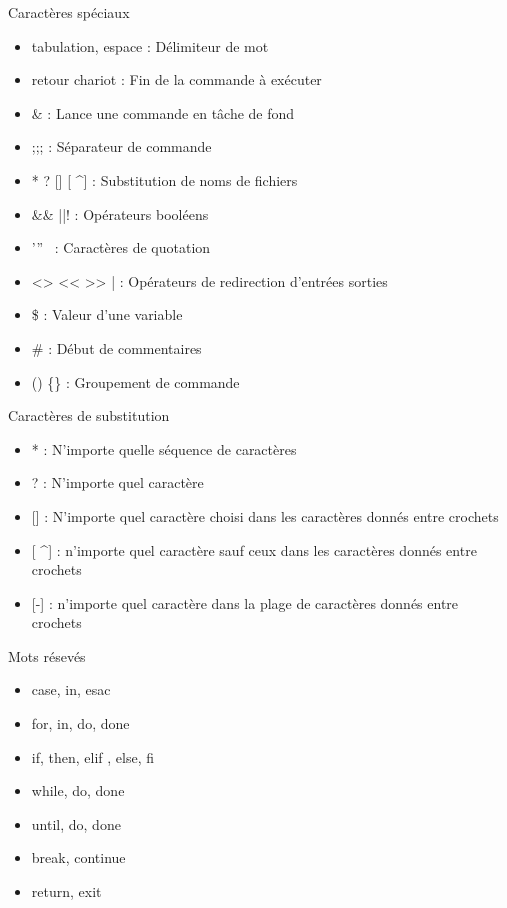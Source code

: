 \documentclass[10pt]{beamer}
\begin{document}
\begin{frame}[fragile]{Caractères spéciaux}

\begin{itemize}
\item \alert{tabulation, espace} : Délimiteur de mot
\item \alert{retour chariot }: Fin de la commande à exécuter
\item \alert{ \& }: Lance une commande en tâche de fond
\item \alert{ ;;; }: Séparateur de commande
\item \alert{* ? [] [ \textasciicircum ] }: Substitution de noms de fichiers
\item \alert{\&\& ||! }: Opérateurs booléens
\item \alert{'” \ }: Caractères de quotation
\item \alert{<> << >> | }: Opérateurs de redirection d'entrées sorties 
\item \alert{\$ } : Valeur d'une variable 
\item \alert{\# } : Début de commentaires
\item \alert{() \{\} } : Groupement de commande
\end{itemize}
\end{frame}


\begin{frame}{Caractères de substitution}
\begin{itemize}
\item \alert{*} : N'importe quelle séquence de caractères
\item \alert{?} : N'importe quel caractère
\item \alert{[]} : N'importe quel caractère choisi dans les caractères donnés entre crochets
\item \alert{[ \textasciicircum ]} : n'importe quel caractère sauf ceux dans les caractères donnés entre crochets
\item \alert{[-]} : n'importe quel caractère dans la plage de caractères donnés entre crochets
\end{itemize}
\end{frame}


\begin{frame}{Mots résevés}
\begin{itemize}
\item \alert{case, in, esac}
\item \alert{for, in, do, done}
\item \alert{if, then, elif , else, fi}
\item \alert{while, do, done}
\item \alert{until, do, done}
\item \alert{break, continue}
\item \alert{return, exit}
\end{itemize}
\end{frame}
\end{document}
